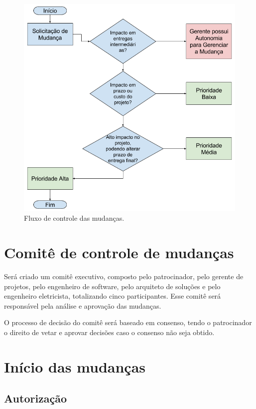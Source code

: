 \begin{figure}[h]
	\includegraphics[width=\textwidth]{images/fluxo-controle-mudancas}
	\caption{Fluxo de controle das mudanças.}
	\label{img:change-control-flow}
\end{figure}

\section{Comitê de controle de mudanças}

Será criado um comitê executivo, composto pelo patrocinador, pelo gerente de projetos, pelo engenheiro de software, pelo arquiteto de soluções e pelo engenheiro eletricista, totalizando cinco participantes. Esse comitê será responsável pela análise e aprovação das mudanças.

O processo de decisão do comitê será baseado em consenso, tendo o patrocinador o direito de vetar e aprovar decisões caso o consenso não seja obtido.

\section{Início das mudanças}

\subsection{Autorização}

